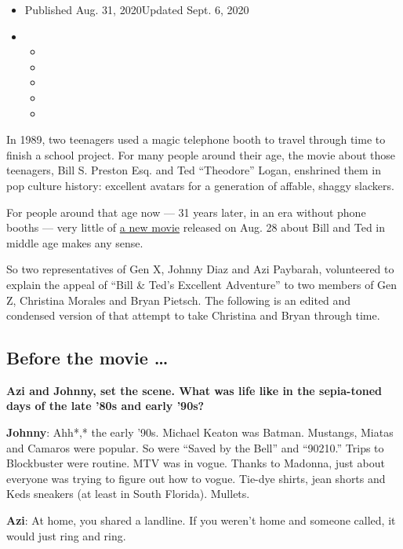 \begin{itemize}
\item
  Published Aug. 31, 2020Updated Sept. 6, 2020
\item
  \begin{itemize}
  \item
  \item
  \item
  \item
  \item
  \end{itemize}
\end{itemize}

In 1989, two teenagers used a magic telephone booth to travel through
time to finish a school project. For many people around their age, the
movie about those teenagers, Bill S. Preston Esq. and Ted ``Theodore''
Logan, enshrined them in pop culture history: excellent avatars for a
generation of affable, shaggy slackers.

For people around that age now --- 31 years later, in an era without
phone booths --- very little of
\href{https://www.nytimes3xbfgragh.onion/2020/08/27/movies/bill-and-ted-face-the-music-review.html}{a
new movie} released on Aug. 28 about Bill and Ted in middle age makes
any sense.

So two representatives of Gen X, Johnny Diaz and Azi Paybarah,
volunteered to explain the appeal of ``Bill \& Ted's Excellent
Adventure'' to two members of Gen Z, Christina Morales and Bryan
Pietsch. The following is an edited and condensed version of that
attempt to take Christina and Bryan through time.

\hypertarget{before-the-movie-}{%
\subsection{Before the movie \ldots{}}\label{before-the-movie-}}

\textbf{Azi and Johnny, set the scene. What was life like in the
sepia-toned days of the late '80s and early '90s?}

\textbf{Johnny}: Ahh*,* the early '90s. Michael Keaton was Batman.
Mustangs, Miatas and Camaros were popular. So were ``Saved by the Bell''
and ``90210.'' Trips to Blockbuster were routine. MTV was in vogue.
Thanks to Madonna, just about everyone was trying to figure out how to
vogue. Tie-dye shirts, jean shorts and Keds sneakers (at least in South
Florida). Mullets.

\textbf{Azi}: At home, you shared a landline. If you weren't home and
someone called, it would just ring and ring.

